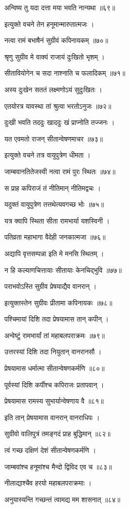 अन्विष्य तु यदा दत्ता मया भवति नान्यथा ॥६९॥

इत्युक्ते वचने तेन हनूमान्मारुतात्मजः ।

नत्वा रामं बभाषैनं सुग्रीवं कपिनायकम् ॥७०॥

श्रृणु सुग्रीव मे वाक्यं राजायं दुःखितो भृशम् ।

सीतावियोगेन च सदा नाश्नाति च फलादिकम् ॥७१॥

अस्य दुःखेन सततं लक्ष्मणोऽयं सुदुःखितः ।

एतयोरत्र यावस्था तां श्रुत्वा भरतोऽनुजः ॥७२॥

दुःखी भवति तददुः खाददुः खं प्राप्नोति तज्जनः ।

यत एवमतो राजन् सीतान्वेषणमाचर ॥७३॥

इत्युक्ते वचने तत्र वायुपुत्रेण धीमता ।

जाम्बवानतितेजस्वी नत्वा रामं पुरः स्थितः ॥७४॥

स प्राह कपिराजं तं नीतिमान् नीतिमद्वचः ।

यदुक्तं वायुपुत्रेण तत्तथेत्यवगच्छ भोः ॥७५॥

यत्र क्वापि स्थिता सीता रामभार्या यशस्विनी ।

पतिव्रता महाभागा वैदेही जनकात्मजा ॥७६॥

अद्यापि वृत्तसम्पन्ना इति मे मनसि स्थितम् ।

न हि कल्याणचित्तायाः सीतायाः केनचिद्भुवि ॥७७॥

पराभवोऽस्ति सुग्रीव प्रेषयाद्यैव वानरान् ।

इत्युक्तस्तेन सुग्रीवः प्रीतामा कपिनायकः ॥७८॥

पश्चिमायां दिशि तदा प्रेषयामास तान् कपीन् ।

अन्वेष्टुं रामभार्यां तां महाबलपराक्रमः ॥७९॥

उत्तरस्यां दिशि तदा नियुतान् वानरानसौ ।

प्रेषयामास धर्मात्मा सीतान्वेषणकर्मणि ॥८०॥

पूर्वस्यां दिशि कर्पीश्च कपिराजः प्रतापवान् ।

प्रेषयामास रामस्य सुभार्यान्वेषणाय वै ॥८१॥

इति तान् प्रेषयामास वानरान् वानराधिपः ।

सुग्रीवो वालिपुत्रं तमङ्गदं प्राह बुद्धिमान् ॥८२॥

त्वं गच्छ दक्षिणं देशं सीतान्वेषणकर्मणि ।

जाम्बवांश्च हनूमांश्च मैन्दो द्विविद एव च ॥८३॥

नीलाद्याश्चैव हरयो महाबलपराक्रमाः ।

अनुयास्यन्ति गच्छन्तं त्वामद्य मम शासनात् ॥८४॥

